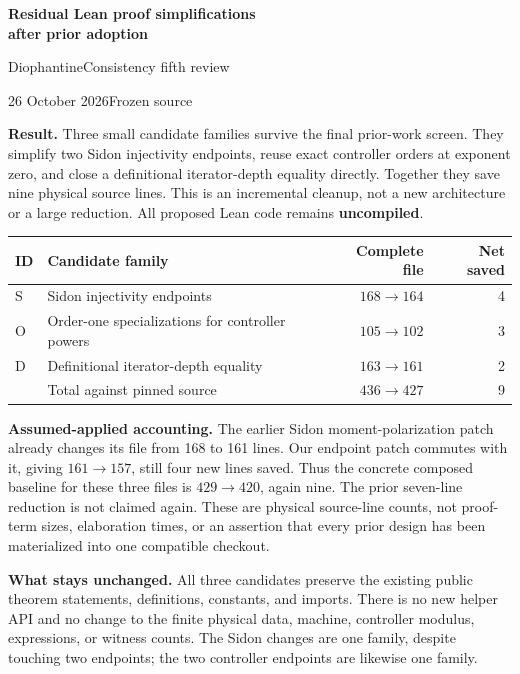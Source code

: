 

\begin{center}
{\LARGE\bfseries Residual Lean proof simplifications\\after prior adoption}\par
\vspace{7pt}DiophantineConsistency fifth review\par
26 October 2026\quad Frozen source 
\end{center}

\textbf{Result.} Three small candidate families survive the final prior-work screen. They simplify two Sidon injectivity endpoints, reuse exact controller orders at exponent zero, and close a definitional iterator-depth equality directly. Together they save nine physical source lines. This is an incremental cleanup, not a new architecture or a large reduction. All proposed Lean code remains \textbf{uncompiled}.

\begin{tabularx}{\linewidth}{@{}lYrr@{}}
\toprule
ID & Candidate family & Complete file & Net saved\\\midrule
S & Sidon injectivity endpoints & $168\to164$ & 4\\
O & Order-one specializations for controller powers & $105\to102$ & 3\\
D & Definitional iterator-depth equality & $163\to161$ & 2\\\midrule
 & Total against pinned source & $436\to427$ & 9\\\bottomrule
\end{tabularx}

\textbf{Assumed-applied accounting.} The earlier Sidon moment-polarization patch already changes its file from 168 to 161 lines. Our endpoint patch commutes with it, giving \textbf{$161\to157$}, still four new lines saved. Thus the concrete composed baseline for these three files is $429\to420$, again nine. The prior seven-line reduction is not claimed again. These are physical source-line counts, not proof-term sizes, elaboration times, or an assertion that every prior design has been materialized into one compatible checkout.

\textbf{What stays unchanged.} All three candidates preserve the existing public theorem statements, definitions, constants, and imports. There is no new helper API and no change to the finite physical data, machine, controller modulus, expressions, or witness counts. The Sidon changes are one family, despite touching two endpoints; the two controller endpoints are likewise one family.

